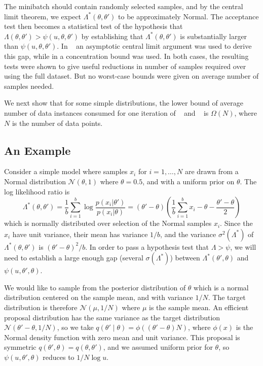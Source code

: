 \documentclass{article}
\begin{document}
The minibatch should contain randomly selected samples, and
by the central limit theorem, we expect $\Lambda^*(\theta,\theta')$ to be approximately
Normal. 
The acceptance test then becomes a statistical test of the hypothesis
that $\Lambda(\theta,\theta') > \psi(u,\theta,\theta')$ by
establishing that $\Lambda^*(\theta,\theta')$ is substantially larger
than $\psi(u,\theta,\theta')$.  In ~\cite{cutting_mh_2014} an
asymptotic central limit argument was used to derive this gap, while
in \cite{icml2014c1_bardenet14} a concentration bound was used. In
both cases, the resulting tests were shown to give useful reductions
in number of samples required over using the full dataset. But no
worst-case bounds were given on average number of samples needed.

We next show that for some simple distributions, the lower
bound of average number of data instances consumed for one iteration of
~\cite{cutting_mh_2014} and ~\cite{icml2014c1_bardenet14} is
$\Omega(N)$, where $N$ is the number of data points.

\subsection{An Example}
Consider a simple model where samples $x_i$ for $i=1,\ldots,N$ are
drawn from a Normal distribution $\mathcal{N}(\theta,1)$ where
$\theta=0.5$, and with a uniform prior on $\theta$. The log likelihood ratio is
\begin{equation}
\Lambda^*(\theta,\theta') =  \frac{1}{b}\sum_{i=1}^b \log\frac{p(x_i|\theta')}{p(x_i|\theta)}=
  (\theta'-\theta)\left(\frac{1}{b}\sum_{i=1}^b x_i-\theta-\frac{\theta'-\theta}{2}\right)
\end{equation}
which is normally distributed over selection of the Normal samples $x_i$.
Since the $x_i$ have unit variance, their mean has variance $1/b$, and the variance $\sigma^2(\Lambda^*)$
of $\Lambda^*(\theta,\theta')$ is $(\theta'-\theta)^2/b$. In order to pass
a hypothesis test that $\Lambda > \psi$, we will need to establish a
large enough gap (several $\sigma(\Lambda^*)$) between $\Lambda^*(\theta',\theta)$
and $\psi(u,\theta',\theta)$.

We would like to sample from the posterior distribution of $\theta$
which is a normal distribution centered on the sample mean, and with
variance $1/N$.  The target distribution is therefore
$\mathcal{N}(\mu,1/N)$ where $\mu$ is the sample mean.  An efficient
proposal distribution has the same variance as the target distribution
$\mathcal{N}(\theta'-\theta,1/N)$, so we take $q(\theta'\mid\theta) =
\phi((\theta'-\theta)N)$, where $\phi(x)$ is the Normal density
function with zero mean and unit variance. This proposal is symmetric
$q(\theta',\theta)=q(\theta,\theta')$, and we assumed uniform
prior for $\theta$, so $\psi(u,\theta',\theta)$ reduces to $1/N\log
u$.
\end{document}
